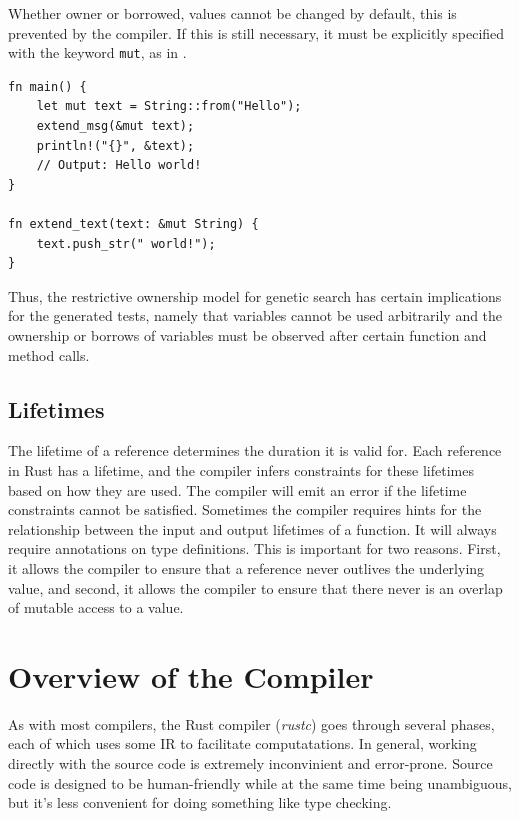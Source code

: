 \documentclass[paper=a4,%
  twoside,%
  BCOR4mm,%
  abstract=true,%
  toc=bibliography,%
  chapterprefix=true,%
  toc=bibliographynumbered,%
  open=right,%
  english,%
  pagesize=pdftex]{scrreprt}
\begin{document}
Whether owner or borrowed, values cannot be changed by default, this is prevented by the compiler. If this is still necessary, it must be explicitly specified with the keyword \texttt{mut}, as in .

\begin{lstlisting}[style=boxed, caption=Transferring the ownership to a method, label=lst:mut-borrowing-method-call]
fn main() {
    let mut text = String::from("Hello");
    extend_msg(&mut text);
    println!("{}", &text);
    // Output: Hello world!
}

fn extend_text(text: &mut String) {
    text.push_str(" world!");
}
\end{lstlisting}

Thus, the restrictive ownership model for genetic search has certain implications for the generated tests, namely that variables cannot be used arbitrarily and the ownership or borrows of variables must be observed after certain function and method calls.

\subsection{Lifetimes}
The lifetime of a reference determines the duration it is valid for. Each reference in Rust has a lifetime, and the compiler infers constraints for these lifetimes based on how they are used. The compiler will emit an error if the lifetime constraints cannot be satisfied. Sometimes the compiler requires hints for the relationship between the input and output lifetimes of a function. It will always require annotations on type definitions. This is important for two reasons. First, it allows the compiler to ensure that a reference never outlives the underlying value, and second, it allows the compiler to ensure that there never is an overlap of mutable access to a value.

\section{Overview of the Compiler}
As with most compilers, the Rust compiler (\emph{rustc}) goes through several phases, each of which uses some \ac{IR} to facilitate computatations. In general, working directly with the source code is extremely inconvinient and error-prone. Source code is designed to be human-friendly while at the same time being unambiguous, but it's less convenient for doing something like type checking.
\end{document}
